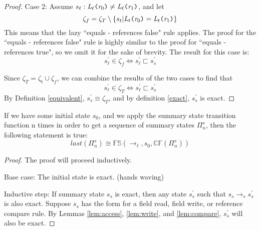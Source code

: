 \begin{proof}
Case 2: Assume $s_\ell : \emph{L}_\ell \texttt{(} \emph{r}_0\texttt{)} \neq \emph{L}_\ell \texttt{(} \emph{r}_1 \texttt{)}$, and let 
$$\zeta_f = \zeta_T \setminus \{ s_t | \emph{L}_t \texttt{(} \emph{r}_0\texttt{)} = \emph{L}_t \texttt{(} \emph{r}_1 \texttt{)} \}$$ 
This means that the lazy ``equals - references false" rule applies. The proof for the ``equals - references false" rule is highly similar to the proof for ``equals - references true", so we omit it for the sake of brevity. The result for this case is:
$$s_\ell^\prime \in \zeta_f \Leftrightarrow s_\ell^\prime \sqsubset s_s^\prime$$

Since $\zeta_T = \zeta_t \cup \zeta_f$, we can combine the results of the two cases to find that 
$$s_\ell^\prime \in \zeta_T \Leftrightarrow s_\ell^\prime \sqsubset s_s^\prime$$
 By Definition \ref{equivalent}, $s_s^\prime \equiv \zeta_T$, and by definition \ref{exact}, $s_s^\prime$ is exact.
\end{proof}

\begin{theorem}
If we have some initial state $s_0$, and we apply the summary state transition function n times in order to get a sequence of summary states $\Pi_n^s$, then the following statement is true:
\begin{equation}
\mathit{last}(\Pi_n^s) \cong \mathbb{FS}(\rightarrow_\ell, s_0, \mathbb{CF}(\Pi_n^s) )
\end{equation}
\end{theorem}
\begin{proof}
The proof will proceed inductively.

Base case: The initial state is exact. (hands waving)

Inductive step: If summary state $s_s$ is exact, then any state $s_s^\prime$ such that $s_s \rightarrow_s s_s^\prime$ is also exact. Suppose $s_s$ has the form for a field read, field write, or reference compare rule. By Lemmas \ref{lem:access}, \ref{lem:write}, and \ref{lem:compare}, $s_s^\prime$ will also be exact.

\end{proof}
